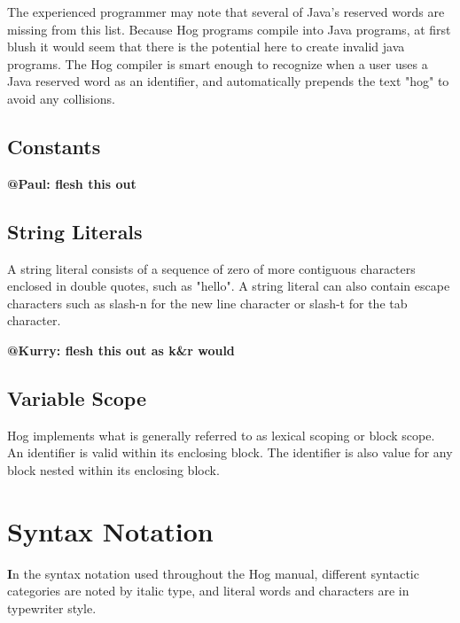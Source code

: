 \documentclass{article}
\begin{document}
The experienced programmer may note that several of Java's reserved words are missing from this list. Because Hog programs
compile into Java programs, at first blush it would seem that there is the potential here to create invalid java programs. The
Hog compiler is smart enough to recognize when a user uses a Java reserved word as an identifier, and automatically prepends
the text "hog" to avoid any collisions.


\subsection{Constants} %
\label{sub:constants}

\textbf{@Paul: flesh this out}


\subsection{String Literals} %
\label{sub:string_literals}
A string literal consists of a sequence of zero of more contiguous characters enclosed
in double quotes, such as "hello". A string literal can also contain escape characters
such as slash-n for the new line character or slash-t for the tab character. 

\textbf{@Kurry: flesh this out as k\&r would}


\subsection{Variable Scope} %
\label{sub:variable_scope}

Hog implements what is generally referred to as lexical scoping or block scope. An
identifier is valid within its enclosing block. The identifier is also value for
any block nested within its enclosing block.



\section{Syntax Notation} %
\label{sec:syntax_notation}

\textbf In the syntax notation used throughout the Hog manual, different syntactic categories are noted by italic type, and literal words and characters are in typewriter style. 
\end{document}

